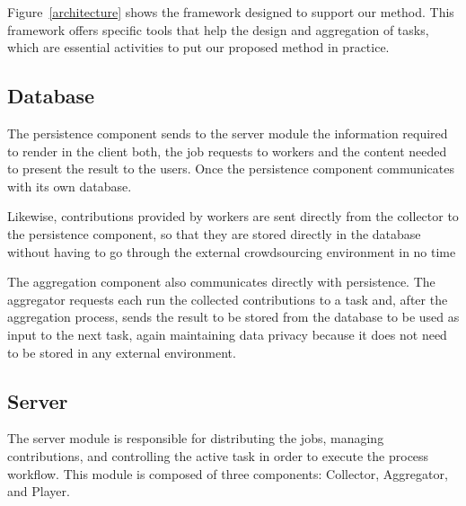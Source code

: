 Figure~\ref{architecture} shows the framework designed to support our method. This framework offers specific tools that help the design and aggregation of tasks, which are essential activities to put our proposed method in practice.


\subsection{Database}



The persistence component sends to the server module the information required to render in the client both, the job requests to workers and the content needed to present the result to the users. Once the persistence component communicates with its own database.

Likewise, contributions provided by workers are sent directly from the collector to the persistence component, so that they are stored directly in the database without having to go through the external crowdsourcing environment in no time

The aggregation component also communicates directly with persistence. The aggregator requests each run the collected contributions to a task and, after the aggregation process, sends the result to be stored from the database to be used as input to the next task, again maintaining data privacy because it does not need to be stored in any external environment.

\subsection{Server}
The server module is responsible for distributing the jobs, managing contributions, and controlling the active task in order to execute the process workflow. This module is composed of three components: Collector, Aggregator, and Player. 


